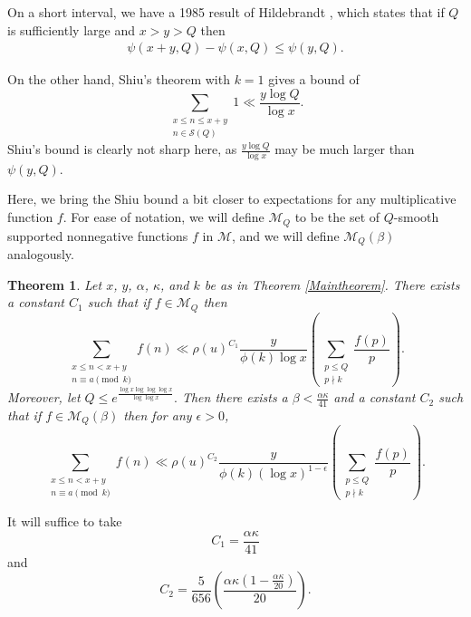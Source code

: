 \documentclass{amsart}
\newtheorem{theorem}{Theorem}[section]
\begin{document}
On a short interval, we have a 1985 result of Hildebrandt \cite{Hi85}, which states that if $Q$ is sufficiently large and $x>y>Q$ then
\begin{gather}\label{Hild}\psi(x+y,Q)-\psi(x,Q)\leq \psi(y,Q).
\end{gather}


On the other hand, Shiu's theorem with $k=1$ gives a bound of 
$$\sum_{\substack{x\leq n\leq x+y \\ n\in \mathcal S(Q)}}1\ll \frac{y\log Q}{\log x}.$$
Shiu's bound is clearly not sharp here, as $\frac{y\log Q}{\log x}$ may be much larger than $\psi(y,Q)$.  


Here, we bring the Shiu bound a bit closer to expectations for any multiplicative function $f$.  For ease of notation, we will define $\mathcal M_Q$ to be the set of $Q$-smooth supported nonnegative functions $f$ in $\mathcal M$, and we will define $\mathcal M_Q(\beta)$ analogously.

\begin{theorem}\label{MnThm2}
Let $x$, $y$, $\alpha$, $\kappa$, and $k$ be as in Theorem \ref{Maintheorem}.  There exists a constant $C_1$ such that if $f\in \mathcal M_Q$ then
$$\sum_{\substack{x\leq n<x+y \\ n\equiv a\pmod k}}f(n)\ll \rho(u)^{C_1}\frac{y}{\phi(k)\log x}\left(\sum_{\substack{p\leq Q \\ p\nmid k}}\frac{f(p)}{p}\right).$$
Moreover, let $Q\leq e^{\frac{\log x\log\log\log x}{\log\log x}}.$  Then there exists a $\beta<\frac{\alpha\kappa}{41}$ and a constant $C_2$ such that if $f\in \mathcal M_Q(\beta)$ then for any $\epsilon>0$,
$$\sum_{\substack{x\leq n<x+y \\ n\equiv a\pmod k}}f(n)\ll \rho(u)^{C_2}\frac{y}{\phi(k)(\log x)^{1-\epsilon}}\left(\sum_{\substack{p\leq Q \\ p\nmid k}}\frac{f(p)}{p}\right).$$
\end{theorem}
It will suffice to take 
$$C_1=\frac{\alpha\kappa}{41}$$ 
and
$$C_2=\frac{5}{656}\left(\frac{\alpha\kappa \left(1-\frac{\alpha \kappa}{20}\right)}{20}\right).$$
\end{document}

